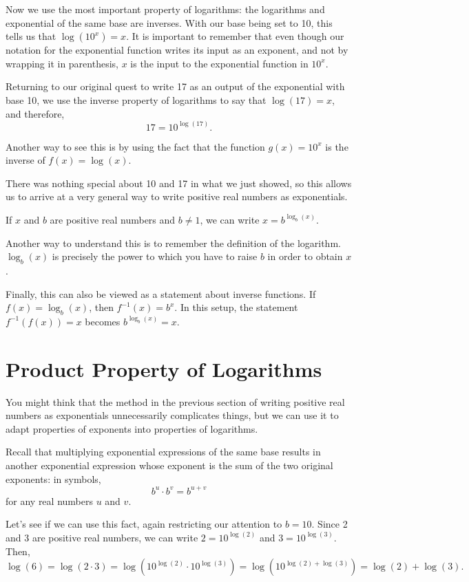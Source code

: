 \documentclass[nooutcomes]{ximera}
\begin{document}
Now we use the most important property of logarithms: the logarithms and exponential of the same base are inverses. With our base being set to 10, this tells us that $\log(10^x) = x$. It is important to remember that even though our notation for the exponential function writes its input as an exponent, and not by wrapping it in parenthesis, $x$ is the input to the exponential function in $10^x$. 

Returning to our original quest to write 17 as an output of the exponential with base 10, we use the inverse property of logarithms to say that $\log(17) = x$, and therefore, 
$$
17 = 10^{\log(17)}.
$$

Another way to see this is by using the fact that the function $g(x) = 10^x$ is the inverse of $f(x) = \log(x)$. 

There was nothing special about 10 and 17 in what we just showed, so this allows us to arrive at a very general way to write positive real numbers as exponentials. 

\begin{callout}
If $x$ and $b$ are positive real numbers and $b \ne 1$, we can write $x = b^{\log_b(x)}$.
\end{callout}
  
Another way to understand this is to remember the definition of the logarithm. $\log_b(x)$ is precisely the power to which you have to raise $b$ in order to obtain $x$. 

Finally, this can also be viewed as a statement about inverse functions. If $f(x) = \log_b(x)$, then $f^{-1}(x) = b^x$. In this setup, the statement $f^{-1}(f(x)) = x$ becomes $b^{\log_b(x)} = x$. 

\section{Product Property of Logarithms}
You might think that the method in the previous section of writing positive real numbers as exponentials unnecessarily complicates things, but we can use it to adapt properties of exponents into properties of logarithms. 

Recall that multiplying exponential expressions of the same base results in another exponential expression whose exponent is the sum of the two original exponents: in symbols, $$b^u \cdot b^v = b^{u + v}$$ for any real numbers $u$ and $v$. 

Let's see if we can use this fact, again restricting our attention to $b = 10$. Since 2 and 3 are positive real numbers, we can write $2 = 10^{\log(2)}$ and $3 = 10^{\log(3)}$. Then,
$$
\log(6) = \log(2\cdot 3) = \log(10^{\log(2)} \cdot 10^{\log(3)}) = \log(10^{\log(2) + \log(3)}) = \log(2) + \log(3).
$$
\end{document}
